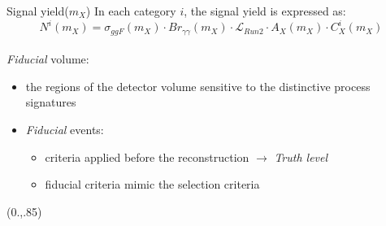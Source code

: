 \documentclass[10pt,UKenglish, leqno, xcolor = dvipsnames]{beamer}
\begin{document}
	\begin{frame}{Signal yield($m_X$)}
		\vfill
		In each category $i$, the signal yield is expressed as:
		$$
		N^i(m_X) = \sigma_{ggF}(m_X) \cdot Br_{\gamma\gamma}(m_X) \cdot \mathcal{L}_{Run2} \cdot A_X(m_X)  \cdot C_X^i(m_X)
		$$
		\vspace{.5cm}\\
		\textit{Fiducial} volume:
		\begin{itemize}
			\item the regions of the detector volume sensitive to the distinctive process signatures
			\item \textit{Fiducial} events:
			\begin{itemize}
				\item criteria applied before the reconstruction $\to$ \textit{Truth level}
				\item fiducial criteria mimic the selection criteria
			\end{itemize}		
		\end{itemize}
		\vfill
		\begin{textblock}{1}(0.,.85)
			\begin{figure}
			\end{figure}
		\end{textblock}
	\end{frame}
	
\end{document}
